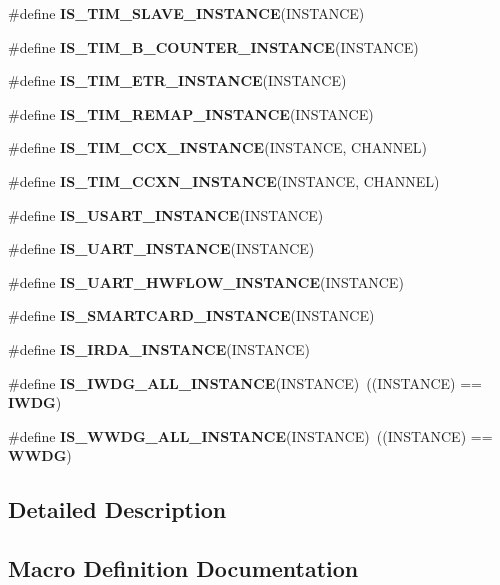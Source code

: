 \begin{DoxyCompactItemize}
\item 
\#define \textbf{ I\+S\+\_\+\+T\+I\+M\+\_\+\+S\+L\+A\+V\+E\+\_\+\+I\+N\+S\+T\+A\+N\+CE}(I\+N\+S\+T\+A\+N\+CE)
\item 
\#define \textbf{ I\+S\+\_\+\+T\+I\+M\+\_\+B\+\_\+\+C\+O\+U\+N\+T\+E\+R\+\_\+\+I\+N\+S\+T\+A\+N\+CE}(I\+N\+S\+T\+A\+N\+CE)
\item 
\#define \textbf{ I\+S\+\_\+\+T\+I\+M\+\_\+\+E\+T\+R\+\_\+\+I\+N\+S\+T\+A\+N\+CE}(I\+N\+S\+T\+A\+N\+CE)
\item 
\#define \textbf{ I\+S\+\_\+\+T\+I\+M\+\_\+\+R\+E\+M\+A\+P\+\_\+\+I\+N\+S\+T\+A\+N\+CE}(I\+N\+S\+T\+A\+N\+CE)
\item 
\#define \textbf{ I\+S\+\_\+\+T\+I\+M\+\_\+\+C\+C\+X\+\_\+\+I\+N\+S\+T\+A\+N\+CE}(I\+N\+S\+T\+A\+N\+CE,  C\+H\+A\+N\+N\+EL)
\item 
\#define \textbf{ I\+S\+\_\+\+T\+I\+M\+\_\+\+C\+C\+X\+N\+\_\+\+I\+N\+S\+T\+A\+N\+CE}(I\+N\+S\+T\+A\+N\+CE,  C\+H\+A\+N\+N\+EL)
\item 
\#define \textbf{ I\+S\+\_\+\+U\+S\+A\+R\+T\+\_\+\+I\+N\+S\+T\+A\+N\+CE}(I\+N\+S\+T\+A\+N\+CE)
\item 
\#define \textbf{ I\+S\+\_\+\+U\+A\+R\+T\+\_\+\+I\+N\+S\+T\+A\+N\+CE}(I\+N\+S\+T\+A\+N\+CE)
\item 
\#define \textbf{ I\+S\+\_\+\+U\+A\+R\+T\+\_\+\+H\+W\+F\+L\+O\+W\+\_\+\+I\+N\+S\+T\+A\+N\+CE}(I\+N\+S\+T\+A\+N\+CE)
\item 
\#define \textbf{ I\+S\+\_\+\+S\+M\+A\+R\+T\+C\+A\+R\+D\+\_\+\+I\+N\+S\+T\+A\+N\+CE}(I\+N\+S\+T\+A\+N\+CE)
\item 
\#define \textbf{ I\+S\+\_\+\+I\+R\+D\+A\+\_\+\+I\+N\+S\+T\+A\+N\+CE}(I\+N\+S\+T\+A\+N\+CE)
\item 
\#define \textbf{ I\+S\+\_\+\+I\+W\+D\+G\+\_\+\+A\+L\+L\+\_\+\+I\+N\+S\+T\+A\+N\+CE}(I\+N\+S\+T\+A\+N\+CE)~((I\+N\+S\+T\+A\+N\+CE) == \textbf{ I\+W\+DG})
\item 
\#define \textbf{ I\+S\+\_\+\+W\+W\+D\+G\+\_\+\+A\+L\+L\+\_\+\+I\+N\+S\+T\+A\+N\+CE}(I\+N\+S\+T\+A\+N\+CE)~((I\+N\+S\+T\+A\+N\+CE) == \textbf{ W\+W\+DG})
\end{DoxyCompactItemize}


\subsection{Detailed Description}


\subsection{Macro Definition Documentation}
\mbox{\label{group__Exported__macros_ga2204b62b378bcf08b3b9006c184c7c23}} 
